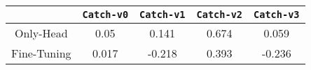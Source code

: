\begin{tabular}{c|c|c|c|c}
\centering
           &  \texttt{Catch-v0} & \texttt{Catch-v1} & \texttt{Catch-v2} & \texttt{Catch-v3} \\ \hline \hline
Only-Head   & 0.05     & 0.141    & 0.674    & 0.059    \\
Fine-Tuning & 0.017    & -0.218   & 0.393    & -0.236   \\   
\end{tabular}
